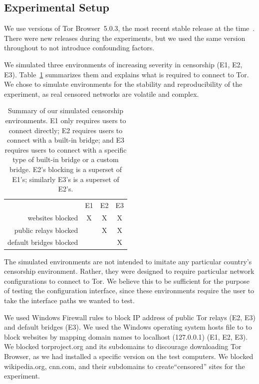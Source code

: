 \documentclass[USenglish,oneside,twocolumn]{article}
\begin{document}
\subsection{Experimental Setup}
\label{sec:environments}
We use versions of Tor Browser~5.0.3, 
the most recent stable release at the time~\cite{torbrowser-503}.
There were new releases during the experiments, but
we used the same version throughout to not introduce
confounding factors.

We simulated three environments of increasing severity in censorship (E1, E2, E3).
Table~\ref{tab:environments} summarizes them and explains what is required to connect to Tor. We chose to 
simulate environments for the stability and reproducibility of the 
experiment, as real censored networks are volatile and complex. 

\begin{table}[t]
\centering
\begin{tabular}{r c c c}
& E1 & E2 & E3 \\
websites blocked & X & X & X \\
public relays blocked & & X & X \\
default bridges blocked & & & X \\
\end{tabular}
\caption{
Summary of our simulated censorship environments.
E1 only requires users to connect directly;
E2 requires users to connect with a built-in bridge;
and E3 requires users to connect with a specific type of built-in bridge
or a custom bridge.
E2's blocking is a superset of E1's;
similarly E3's is a superset of E2's.
}
\label{tab:environments}
\end{table}

The simulated environments are not intended to imitate any particular country's censorship environment. Rather, they were designed to require particular network configurations
to connect to Tor. We believe this to be sufficient for the purpose of testing the configuration interface, since these environments require the user to take the interface paths we wanted to test. 

We used Windows Firewall rules to block IP address of public Tor relays (E2, E3) and default bridges (E3). 
We used the Windows operating system hosts file to to block websites by
mapping domain names to localhost (127.0.0.1) (E1, E2, E3). We blocked torproject.org and its subdomains to discourage downloading Tor Browser, as we had installed a specific version on the test computers.  We blocked wikipedia.org, cnn.com, and their subdomains to create``censored'' sites for the experiment. 
\end{document}
